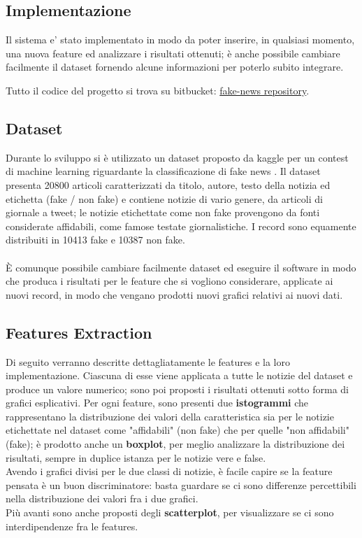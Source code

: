 \documentclass{article}
\begin{document}
\begin{multicols}{2}
		    
	    \section{Implementazione}
		    Il sistema e' stato implementato in modo da poter inserire, in qualsiasi momento, una nuova feature ed analizzare i risultati ottenuti; è anche possibile cambiare facilmente il dataset fornendo alcune informazioni per poterlo subito integrare.
		    
		    Tutto il codice del progetto si trova su bitbucket: 
		    \href{https://bitbucket.org/IcedGarion/fake-news}{fake-news repository}. 
		    
			\subsection{Dataset}
			Durante lo sviluppo si è utilizzato un dataset proposto da kaggle per un contest di machine learning riguardante la classificazione di fake news \cite{kaggledataset}. Il dataset presenta 20800 articoli caratterizzati da titolo, autore, testo della notizia ed etichetta (fake / non fake) e contiene notizie di vario genere, da articoli di giornale a tweet; le notizie etichettate come non fake provengono da fonti considerate affidabili, come famose testate giornalistiche. I record sono equamente distribuiti in 10413 fake e 10387 non fake.
			\\~\\
			È comunque possibile cambiare facilmente dataset ed eseguire il software in modo che produca i risultati per le feature che si vogliono considerare, applicate ai nuovi record, in modo che vengano prodotti nuovi grafici relativi ai nuovi dati.
			
			
			\subsection{Features Extraction}
			Di seguito verranno descritte dettagliatamente le features e la loro implementazione.
			Ciascuna di esse viene applicata a tutte le notizie del dataset e produce un valore numerico; sono poi proposti i risultati ottenuti sotto forma di grafici esplicativi. Per ogni feature, sono presenti due \textbf{istogrammi} che rappresentano la distribuzione dei valori della caratteristica sia per le notizie etichettate nel dataset come "affidabili" (non fake) che per quelle "non affidabili" (fake); è prodotto anche un \textbf{boxplot}, per meglio analizzare la distribuzione dei risultati, sempre in duplice istanza per le notizie vere e false.\\
			Avendo i grafici divisi per le due classi di notizie, è facile capire se la feature pensata è un buon discriminatore: basta guardare se ci sono differenze percettibili nella distribuzione dei valori fra i due grafici.\\
			Più avanti sono anche proposti degli \textbf{scatterplot}, per visualizzare se ci sono interdipendenze fra le features.
			

\end{multicols}
\end{document}

